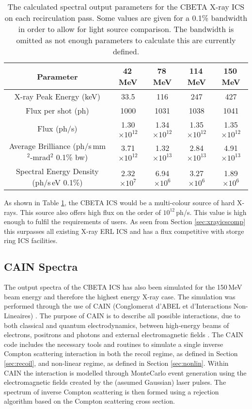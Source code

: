 \documentclass[11pt]{article}
\begin{document}
\begin{table}[H]
\centering
\begin{tabular}{|c||c|c|c|c|}
\hline
\textbf{Parameter} & \textbf{42\,MeV} & \textbf{78\,MeV} & \textbf{114\,MeV} & \textbf{150\,MeV} \\
\hline
X-ray Peak Energy (keV) & 33.5 & 116 & 247 & 427 \\
\hline
Flux per shot (ph) & 1000 & 1031 & 1038 & 1041 \\
\hline
Flux (ph/s) & 1.30$\times10^{12}$ & 1.34$\times10^{12}$ & 1.35$\times10^{12}$ & 1.35$\times10^{12}$ \\
\hline
Average Brilliance (ph/s\,mm$^{2}$-mrad$^{2}$ 0.1\% bw) & 3.71$\times10^{12}$ & 1.32$\times10^{13}$ & 2.84$\times10^{13}$ & 4.91$\times10^{13}$ \\
\hline
Spectral Energy Density (ph/s\,eV 0.1\%) & 2.32$\times10^{7}$ & 6.94$\times10^{6}$ & 3.27$\times10^{6}$ & 1.89$\times10^{6}$ \\
\hline
\end{tabular}
\caption{\label{tab:CBETAout} The calculated spectral output parameters for the CBETA X-ray ICS on each recirculation pass. Some values are given for a 0.1\% bandwidth in order to allow for light source comparison. The bandwidth is omitted as not enough parameters to calculate this are currently defined.}
\end{table}

As shown in Table \ref{tab:CBETAout}, the CBETA ICS would be a multi-colour source of hard X-rays. This source also offers high flux on the order of $10^{12}$\,ph/s. This value is high enough to fulfil the requirements of users. As seen from Section \ref{sec:xrayicscomp} this surpasses all existing X-ray ERL ICS and has a flux competitive with storge ring ICS facilities.

\subsection{CAIN Spectra}

The output spectra of the CBETA ICS has also been simulated for the 150\,MeV beam energy and therefore the highest energy X-ray case. The simulation was performed through the use of CAIN (Conglomerat d'ABEL et d'Interactions Non-Lineaires) \cite{CAIN}. The purpose of CAIN is to describe all possible interactions, due to both classical and quantum electrodynamics, between high-energy beams of electrons, positrons and photons and external electromagnetic fields \cite{CAIN}. The CAIN code includes the necessary tools and routines to simulate a single inverse Compton scattering interaction in both the recoil regime, as defined in Section \ref{sec:recoil}, and non-linear regime, as defined in Section \ref{sec:nonlin}. Within CAIN the interaction is modelled through MonteCarlo event generation using the electromagnetic fields created by the (assumed Gaussian) laser pulses. The spectrum of inverse Compton scattering is then formed using a rejection algorithm based on the Compton scattering cross section. 
\end{document}
